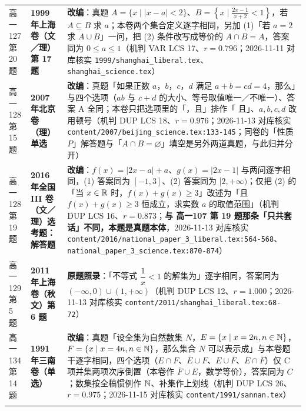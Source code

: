 \documentclass[a4paper,11pt]{article}
\begin{document}
\begin{xltabular}{\textwidth}{@{}>{\raggedright\arraybackslash}p{2.85cm}>{\raggedright\arraybackslash}p{3.99cm}>{\raggedright\arraybackslash}p{7.89cm}@{}}
高一127 第 20 题 & \textbf{1999 年上海卷（文／理）第 17 题} & \textbf{改编}：真题 \(A=\allowbreak \{x\mid\allowbreak \lvert x-a\rvert<2\}\)、\(B=\allowbreak \left\{x\mid\allowbreak \frac{2x-1}{x+\allowbreak 2}<1\right\}\)，若 \(A\subseteq\allowbreak  B\) 求 \(a\)；本卷两个集合定义逐字相同，另加 (1)「若 \(a=\allowbreak 2\) 求 \(A\cup\allowbreak  B\)」一问，把 (2) 条件改写成等价的 \(A\cap\allowbreak  B=A\)，答案同为 \(0\leqslant\allowbreak  a\leqslant\allowbreak 1\)（机判 VAR LCS 17、\(r=\allowbreak 0.796\)；2026-11-11 对库核实 \texttt{1999/\allowbreak{}shanghai\_liberal.tex}、\texttt{shanghai\_science.tex}） \\ \addlinespace[1pt]
高一128 第 15 题 & \textbf{2007 年北京卷（理）单选} & \textbf{改编}：真题「如果正数 \(a\)，\(b\)，\(c\)，\(d\) 满足 \(a+b=cd=\allowbreak 4\)，那么」与四个选项（\(ab\) 与 \(c+d\) 的大小、等号取值唯一／不唯一）、答案 A 全同；本卷只把选项里的「，且」排作「 且」、\(a,b,c,d\) 改用顿号（机判 DUP LCS 18、\(r=\allowbreak 0.976\)；2026-11-13 对库核实 \texttt{content/\allowbreak{}2007/\allowbreak{}beijing\_science.tex:133-\allowbreak{}145}；同卷的「性质 \(P\)」解答题与「\(A\cap\allowbreak  B=\allowbreak \varnothing\)」填空是另外两道真题，与此归并分开） \\ \addlinespace[1pt]
高一128 第 19 题 & \textbf{2016 年全国 III 卷（文／理）选考题：解答题} & \textbf{改编}：\(f(x)=\allowbreak \lvert 2x-a\rvert+a\)、\(g(x)=\allowbreak \lvert 2x-1\rvert\) 与两问逐字相同，(1) 答案同为 \([-1,\allowbreak 3]\)、(2) 答案同为 \([2,\allowbreak +\allowbreak \infty)\)；仅把 (2) 的「当 \(x\in\mathbb{R}\) 时，\(f(x)+g(x)\ge3\)」改述为「且 \(f(x)+g(x)\geqslant\allowbreak 3\) 恒成立，求实数 \(a\) 的取值范围」（机判 DUP LCS 16、\(r=\allowbreak 0.873\)；\textbf{与 高一107 第 19 题那条「只共套话」不同，本题是真题本体}，2026-11-13 对库核实 \texttt{content/\allowbreak{}2016/\allowbreak{}national\_paper\_3\_liberal.tex:564-\allowbreak{}568}、\texttt{national\_paper\_3\_science.tex:870-\allowbreak{}874}） \\ \addlinespace[1pt]
高一129 第 5 题 & \textbf{2011 年上海卷（秋文）第 6 题} & \textbf{原题照录}：「不等式 \(\dfrac1x<1\) 的解集为」逐字相同，答案同为 \((-\infty,\allowbreak 0)\cup\allowbreak (1,\allowbreak +\allowbreak \infty)\)（机判 DUP LCS 12、\(r=\allowbreak 1.000\)；2026-11-13 对库核实 \texttt{content/\allowbreak{}2011/\allowbreak{}shanghai\_liberal.tex:68-\allowbreak{}72}） \\ \addlinespace[1pt]
高一134 第 14 题 & \textbf{1991 年三南卷（单选）} & \textbf{改编}：真题「设全集为自然数集 \(N\)，\(E=\allowbreak \{x\mid\allowbreak  x=\allowbreak 2n,n\in\mathbb{N}\}\)，\(F=\allowbreak \{x\mid\allowbreak  x=\allowbreak 4n,n\in\mathbb{N}\}\)，那么集合 \(N\) 可以表示成」与本卷题干逐字相同，四个选项（\(E\cap\allowbreak  F\)、\(\overline{E}\cup\allowbreak  F\)、\(E\cup\allowbreak \overline{F}\)、\(\overline{E}\cap\allowbreak \overline{F}\)）仅 C 项并集两项次序倒置（本卷作 \(\overline{F}\cup\allowbreak  E\)，数学等价），答案同为 \(C\)；数集按全稿惯例作 \(\mathbb{N}\)、补集作上划线（机判 DUP LCS 26、\(r=\allowbreak 0.975\)；2026-11-15 对库核实 \texttt{content/\allowbreak{}1991/\allowbreak{}sannan.tex}） \\ \addlinespace[1pt]

\end{xltabular}
\end{document}
